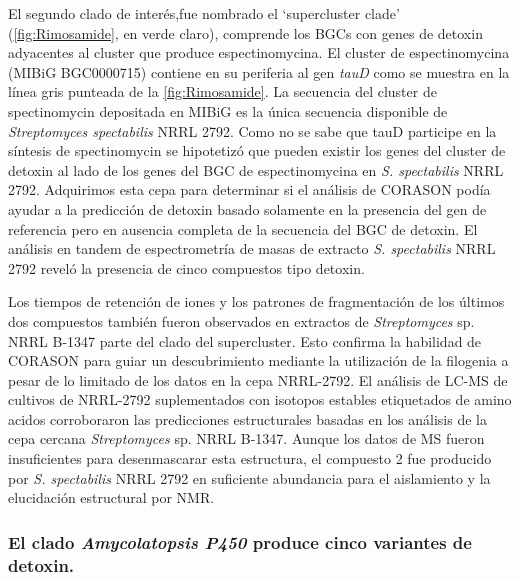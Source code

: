 \documentclass[12pt,twoside]{reedthesis}
\begin{document}
  El segundo clado de interés,fue nombrado el `supercluster clade'
  (\autoref{fig:Rimosamide}, en verde claro), comprende los BGCs con genes
  de detoxin adyacentes al cluster que produce espectinomycina. El cluster
  de espectinomycina (MIBiG BGC0000715) contiene en su periferia al gen
  \emph{tauD} como se muestra en la línea gris punteada de la
  \autoref{fig:Rimosamide}. La secuencia del cluster de spectinomycin
  depositada en MIBiG es la única secuencia disponible de
  \emph{Streptomyces spectabilis} NRRL 2792. Como no se sabe que tauD
  participe en la síntesis de spectinomycin se hipotetizó que pueden
  existir los genes del cluster de detoxin al lado de los genes del BGC de
  espectinomycina en \emph{S. spectabilis} NRRL 2792. Adquirimos esta cepa
  para determinar si el análisis de CORASON podía ayudar a la predicción
  de detoxin basado solamente en la presencia del gen de referencia pero
  en ausencia completa de la secuencia del BGC de detoxin. El análisis en
  tandem de espectrometría de masas de extracto \emph{S. spectabilis} NRRL
  2792 reveló la presencia de cinco compuestos tipo detoxin.
  
  Los tiempos de retención de iones y los patrones de fragmentación de los
  últimos dos compuestos también fueron observados en extractos de
  \emph{Streptomyces} sp. NRRL B-1347 parte del clado del supercluster.
  Esto confirma la habilidad de CORASON para guiar un descubrimiento
  mediante la utilización de la filogenia a pesar de lo limitado de los
  datos en la cepa NRRL-2792. El análisis de LC-MS de cultivos de
  NRRL-2792 suplementados con isotopos estables etiquetados de amino
  acidos corroboraron las predicciones estructurales basadas en los
  análisis de la cepa cercana \emph{Streptomyces} sp. NRRL B-1347. Aunque
  los datos de MS fueron insuficientes para desenmascarar esta estructura,
  el compuesto 2 fue producido por \emph{S. spectabilis} NRRL 2792 en
  suficiente abundancia para el aislamiento y la elucidación estructural
  por NMR.
  
  \subsubsection{\texorpdfstring{El clado \emph{Amycolatopsis P450}
  produce cinco variantes de
  detoxin.}{El clado Amycolatopsis P450 produce cinco variantes de detoxin.}}\label{el-clado-amycolatopsis-p450-produce-cinco-variantes-de-detoxin.}
  
\end{document}
